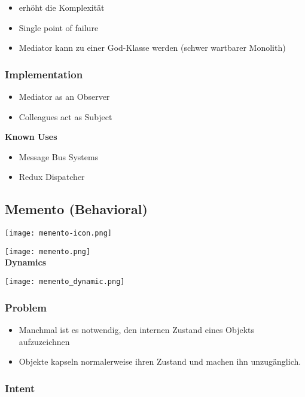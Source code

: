 \begin{itemize}
    \item erhöht die Komplexität
    \item Single point of failure
    \item Mediator kann zu einer God-Klasse werden (schwer wartbarer Monolith)
\end{itemize}

\subsubsection{Implementation}
\begin{itemize}
    \item Mediator as an Observer
    \item Colleagues act as Subject
\end{itemize}
\vspace{10pt}
\textbf{Known Uses}
\begin{itemize}
    \item Message Bus Systems
    \item Redux Dispatcher
\end{itemize}

\subsection{Memento (Behavioral)}

\texttt{[image: memento-icon.png]}

\texttt{[image: memento.png]} \\

\columnbreak
\textbf{Dynamics}

\texttt{[image: memento\_dynamic.png]}

\subsubsection{Problem}
\begin{itemize}
    \item Manchmal ist es notwendig, den internen Zustand eines Objekts aufzuzeichnen
    \item Objekte kapseln normalerweise ihren Zustand und machen ihn unzugänglich.
\end{itemize}

\subsubsection{Intent}

